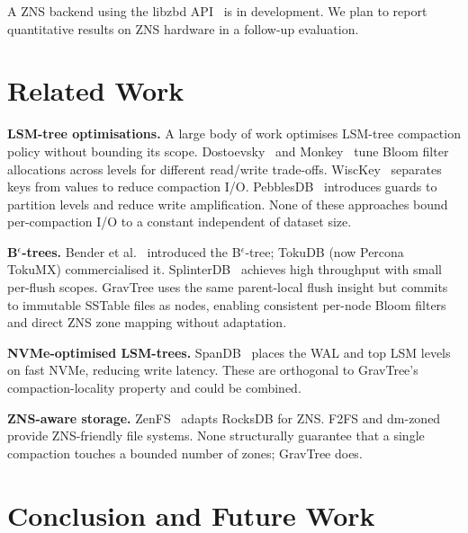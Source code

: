 \documentclass[10pt,twocolumn]{article}
\begin{document}
A ZNS backend using the libzbd API~\cite{libzbd} is in development.  We plan
to report quantitative results on ZNS hardware in a follow-up evaluation.

\section{Related Work}
\label{sec:related}

\textbf{LSM-tree optimisations.}  A large body of work optimises LSM-tree
compaction policy without bounding its scope.  Dostoevsky~\cite{dostoevsky}
and Monkey~\cite{monkey} tune Bloom filter allocations across levels for
different read/write trade-offs.  WiscKey~\cite{wisckey} separates keys from
values to reduce compaction I/O.  PebblesDB~\cite{pebblesdb} introduces guards
to partition levels and reduce write amplification.  None of these approaches
bound per-compaction I/O to a constant independent of dataset size.

\textbf{\texorpdfstring{B$^\epsilon$-trees.}{B-epsilon trees.}}  Bender et al.~\cite{bender2007cache} introduced
the \texorpdfstring{B$^\epsilon$-tree}{B-epsilon-tree}; TokuDB (now Percona TokuMX) commercialised it.
SplinterDB~\cite{splinterdb} achieves high throughput with small per-flush
scopes.  GravTree uses the same parent-local flush insight but commits to
immutable SSTable files as nodes, enabling consistent per-node Bloom filters
and direct ZNS zone mapping without adaptation.

\textbf{NVMe-optimised LSM-trees.}  SpanDB~\cite{spandb} places the WAL and
top LSM levels on fast NVMe, reducing write latency.  These are orthogonal
to GravTree's compaction-locality property and could be combined.

\textbf{ZNS-aware storage.}  ZenFS~\cite{zenfs} adapts RocksDB for ZNS.
F2FS and dm-zoned provide ZNS-friendly file systems.  None structurally
guarantee that a single compaction touches a bounded number of zones;
GravTree does.

\section{Conclusion and Future Work}
\label{sec:conclusion}
\end{document}
